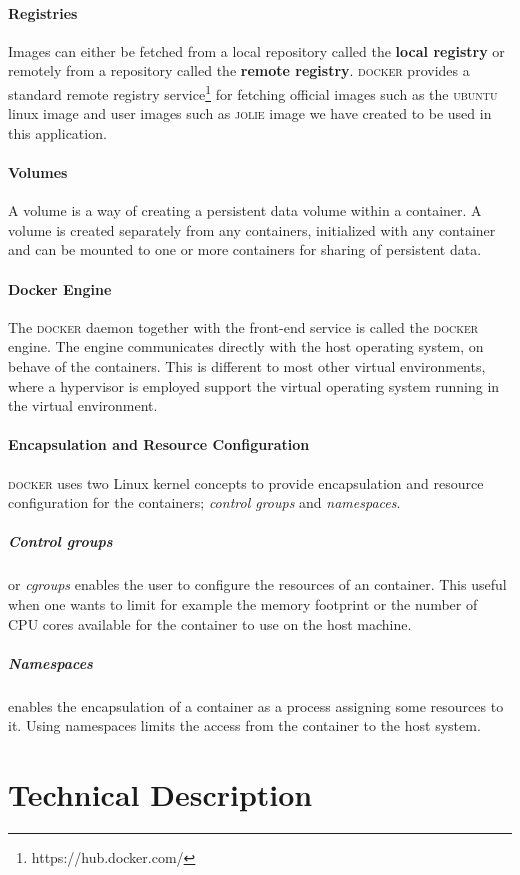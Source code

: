\documentclass[12pt]{article}
\newcommand{\docker}[0] {\textsc{docker}}
\newcommand{\jolie}[0] {\textsc{jolie}}
\newcommand{\ubuntu} {\textsc{ubuntu}}
\begin{document}
\paragraph{Registries}
Images can either be fetched from a local repository called the \textbf{local registry} or remotely from a repository called the \textbf{remote registry}. \docker{} provides a standard remote registry service\footnote{https://hub.docker.com/} for fetching official images such as the \ubuntu{} linux image and user images such as \jolie{} image we have created to be used in this application.

\paragraph{Volumes} A volume is a way of creating a persistent data volume within a container. A volume is created separately from any containers, initialized with any container and can be mounted to one or more containers for sharing of persistent data.

\paragraph{Docker Engine} The \docker{} daemon together with the front-end service is called the \docker{} engine. The engine communicates directly with the host operating system, on behave of the containers. This is different to most other virtual environments, where a hypervisor is employed support the virtual operating system running in the virtual environment.\cite{DBLP:journals/software/Anderson15}

\paragraph{Encapsulation and Resource Configuration}
\docker{} uses two Linux kernel concepts to provide encapsulation and resource configuration for the containers; \textit{control groups} and \textit{namespaces}. 
\subparagraph{Control groups} or \textit{cgroups} enables the user to configure the resources of an container. This useful when one wants to limit for example the memory footprint or the number of CPU cores available for the container to use on the host machine.
\subparagraph{Namespaces} enables the encapsulation of a container as a process assigning some resources to it. Using namespaces limits the access from the container to the host system.  

\section{Technical Description}
\end{document}
